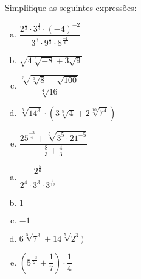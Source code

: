 \begin{exer}
Simplifique as seguintes expressões:
\begin{multicols}{2}
\begin{enumerate}[a)]
\item $\dfrac{2^{\frac{1}{3}} \cdot 3^{\frac{1}{4}} \cdot (-4)^{-2}}{3^3 \cdot 9^{\frac{1}{3}} \cdot 8^{\frac{-1}{6}}}$
\item $\sqrt{4 \sqrt[3]{-8} + 3\sqrt{9}}$
\item $\dfrac{\sqrt[3]{\sqrt[3]{8} - \sqrt{100}}}{\sqrt[4]{16}}$
\item $\sqrt[5]{14^3} \cdot (3 \sqrt[5]{4} + 2 \sqrt[10]{7^4})$
\item $\dfrac{25^{\frac{-3}{4}} + \sqrt[5]{3^5 \cdot 21^{-5}}}{\frac{8}{3} + \frac{4}{3}}$
\end{enumerate}
\end{multicols}
\end{exer}
\begin{resp}
\begin{multicols}{2}
\begin{enumerate}[a)]
\item $\dfrac{2^{\frac{5}{6}}}{2^4 \cdot 3^3 \cdot 3^{\frac{5}{12}}}$
\item $1$
\item $-1$
\item $6\sqrt[5]{7^3} + 14 \sqrt[5]{2^3})$
\item $\left(5^{\frac{-3}{2}} + \dfrac{1}{7} \right) \cdot \dfrac{1}{4}$
\end{enumerate}
\end{multicols}
\end{resp}
